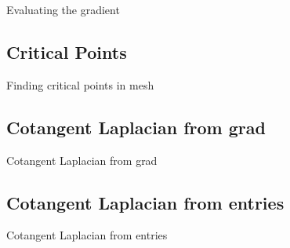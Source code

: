 \begin{algorithm}
\caption{Evaluating the gradient}
\begin{algorithmic}[1]

\EndProcedure
\end{algorithmic}
\end{algorithm}

\subsection{Critical Points}

\begin{algorithm}
\caption{Finding critical points in mesh}
\begin{algorithmic}[1]

\EndProcedure
\end{algorithmic}
\end{algorithm}

\subsection{Cotangent Laplacian from grad}

\begin{algorithm}
\caption{Cotangent Laplacian from grad}
\begin{algorithmic}[1]

\EndProcedure
\end{algorithmic}
\end{algorithm}

\subsection{Cotangent Laplacian from entries}


\begin{algorithm}
\caption{Cotangent Laplacian from entries}
\begin{algorithmic}[1]

\EndProcedure
\end{algorithmic}
\end{algorithm}